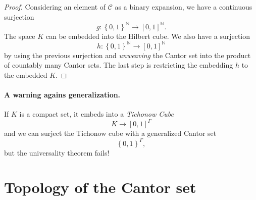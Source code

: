 \begin{proof}
Considering an element of \( \mathcal{C} \) as a binary expansion, we have a continuous surjection
\[ 
    g: \left\{ 0,1 \right\}^{ \mathbb{N} } \to [0,1]^{ \mathbb{N} }.
\]
The space \( K \) can be embedded into the Hilbert cube. We also have a surjection
\[ 
    h: \left\{ 0,1 \right\}^{ \mathbb{N} } \to [0,1]^{ \mathbb{N} }
\]
by using the previous surjection and \emph{unweaving} the Cantor set into the product of countably many Cantor sets. The last step is restricting the embedding \( h \) to the embedded \( K \).
\end{proof}

\paragraph{A warning agains generalization.} If \( K \) is a compact set, it embeds into a \emph{Tichonow Cube}
\[ 
    K \to [0,1]^\Gamma 
\]
and we can surject the Tichonow cube with a generalized Cantor set
\[ 
    \left\{ 0,1 \right\}^{\Gamma},
\]
but the universality theorem fails!

\section{Topology of the Cantor set}




